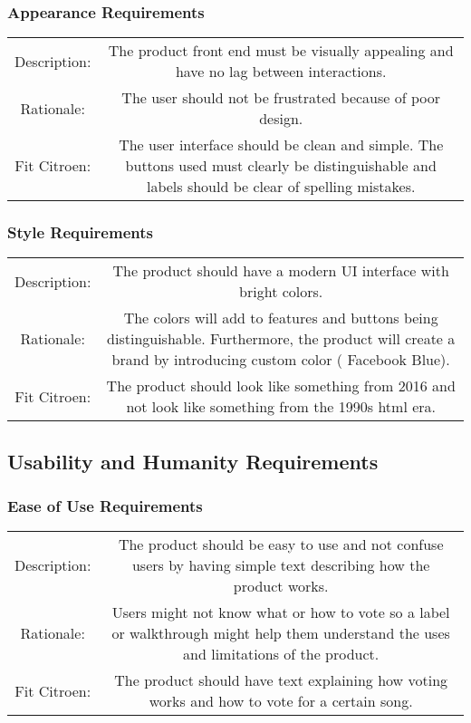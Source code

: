 \documentclass[12pt, titlepage]{article}
\begin{document}
\subsubsection{Appearance Requirements}
\begin{center}
\begin{tabular}{| c | c | }
\hline
Description:&The product front end must be visually appealing and have no lag between interactions.\\ 
Rationale:& The user should not be frustrated because of poor design.\\
Fit Citroen: & The user interface should be clean and simple. The buttons used must clearly be distinguishable and labels should be clear of spelling mistakes. \\
\hline
\end{tabular}
\end{center}
\subsubsection{Style Requirements}
\begin{center}
\begin{tabular}{| c | c | }
\hline
Description: &The product should have a modern UI interface with bright colors.\\ 
Rationale: & The colors will add to features and buttons being distinguishable. Furthermore, the product will create a brand by introducing custom color ( Facebook Blue).\\
Fit Citroen: & The product should look like something from 2016 and not look like something from the 1990s html era. \\
\hline
\end{tabular}
\end{center}

\subsection{Usability and Humanity Requirements}

\subsubsection{Ease of Use Requirements}
\begin{center}
\begin{tabular}{| c | c | }
\hline
Description: &The product should be easy to use and not confuse users by having simple text describing how the product works.\\ 
Rationale: & Users might not know what or how to vote so a label or walkthrough might help them understand the uses and limitations of the product.\\
Fit Citroen: & The product should have text explaining how voting works and how to vote for a certain song. \\
\hline
\end{tabular}
\end{center}
\end{document}
